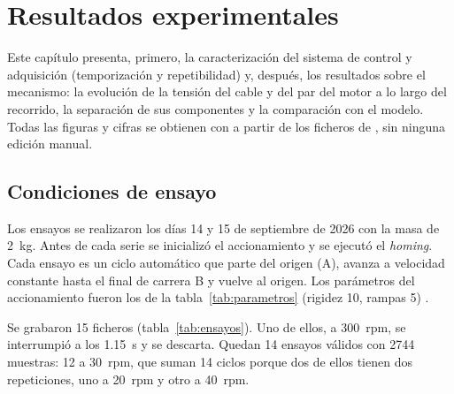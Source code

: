\chapter{Resultados experimentales}
\label{chap:resultados}

Este capítulo presenta, primero, la caracterización del sistema de control y adquisición
(temporización y repetibilidad) y, después, los resultados sobre el mecanismo: la evolución de la
tensión del cable y del par del motor a lo largo del recorrido, la separación de sus componentes y
la comparación con el modelo. Todas las figuras y cifras se obtienen con
 a partir de los ficheros de , sin
ninguna edición manual.

\section{Condiciones de ensayo}


Los ensayos se realizaron los días 14 y 15 de septiembre de 2026 con la masa de \SI{2}{\kilo\gram}.
Antes de cada serie se inicializó el accionamiento y se ejecutó el \emph{homing}. Cada ensayo es un
ciclo automático que parte del origen (A), avanza a velocidad constante hasta el final de carrera B
y vuelve al origen. Los parámetros del accionamiento fueron los de la tabla~\ref{tab:parametros}
(rigidez 10, rampas 5) .

Se grabaron 15 ficheros (tabla~\ref{tab:ensayos}). Uno de ellos, a \SI{300}{rpm}, se interrumpió
a los \SI{1.15}{\second} y se descarta. Quedan 14 ensayos válidos con 2744 muestras: 12 a
\SI{30}{rpm}, que suman 14 ciclos porque dos de ellos tienen dos repeticiones, uno a \SI{20}{rpm} y
otro a \SI{40}{rpm}.

